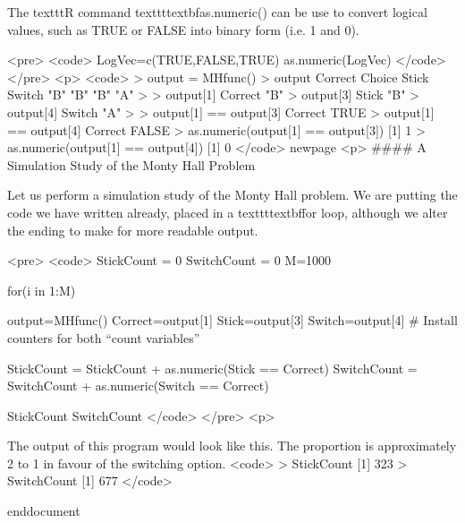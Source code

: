 The texttt{R} command texttt{textbf{as.numeric()}} can be use to convert logical values, such as TRUE or FALSE into binary form (i.e. 1 and 0).

<pre>
<code>
LogVec=c(TRUE,FALSE,TRUE)
as.numeric(LogVec)
</code> 
</pre>
<p>
<code>
> output = MHfunc()
> output
Correct  Choice   Stick  Switch 
"B"     "B"     "B"     "A" 
> 
> output[1]
Correct 
"B" 
> output[3]
Stick 
"B" 
> output[4]
Switch 
"A" 
> 
> output[1] == output[3]
Correct 
TRUE 
> output[1] == output[4]
Correct 
FALSE 
> as.numeric(output[1] == output[3])
[1] 1
> as.numeric(output[1] == output[4])
[1] 0
</code>
newpage
<p>
#### {A Simulation Study of the Monty Hall Problem}

Let us perform a simulation study of the Monty Hall problem. We are putting the code we have written already, placed in a texttt{textbf{for}} loop, although we alter the ending to make for more readable output.

<pre>
<code>
StickCount = 0
SwitchCount = 0
M=1000

for(i in 1:M)
 {
 output=MHfunc()
 Correct=output[1]
 Stick=output[3]
 Switch=output[4]
 # Install counters for both “count variables”

 StickCount = StickCount + as.numeric(Stick  ==  Correct)
 SwitchCount = SwitchCount + as.numeric(Switch  ==  Correct)
}
StickCount
SwitchCount
</code> 
</pre>
<p>

The output of this program would look like this. The proportion is approximately 2 to 1 in favour of the switching option.
<code>
> StickCount
[1] 323
> SwitchCount
[1] 677
</code>






end{document}

